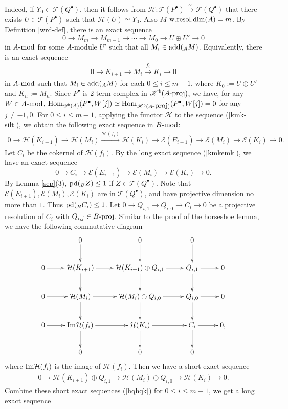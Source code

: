 \documentclass[12pt]{article}
\numberwithin{equation}{section}
\theoremstyle{definition}
\newcommand{\add}{{\rm add}}
\def\wrd{\mathop{\rm w.resol.dim}\nolimits}
\newcommand{\pd}{{\rm pd}}
\def\E{\mathcal{E}}
\newcommand{\F}{{\mathcal F}}
\def\H{\mathcal{H}}
\newcommand{\T}{{\mathcal T}}
\newcommand{\cpx}[1]{#1^{\bullet}}
\newcommand{\Db}[1]{{\mathscr D}^b(#1)}
\newcommand{\Kb}[1]{{\mathscr K}^b(#1)}
\newcommand{\modcat}{\ensuremath{\mbox{{\rm -mod}}}}
\newcommand{\pmodcat}[1]{#1\mbox{{\rm -proj}}}
\newcommand{\Hom}{{\rm Hom}}
\newcommand{\lra}{\longrightarrow}
\newcommand{\lraf}[1]{\stackrel{#1}{\lra}}
\newcommand{\ra}{\rightarrow}
\begin{document}
Indeed, if $Y_0\in \F(Q^{\bullet})$, then it follows from $\H: \T(P^{\bullet})\lraf{\simeq} \F(Q^{\bullet})$ that there exists $U\in \T(P^{\bullet})$ such that $\H(U)\simeq Y_0$.
Also $M$-$\wrd(A)=m$.
By Definition \ref{wrd-def}, there is an exact sequence
$$0\lra M_m\lra M_{m-1}\lra \cdots\lra M_0\lra U\oplus U'\lra 0$$
in $A\modcat$ for some $A$-module $U'$ such that all $M_i\in\add(_AM)$.
Equivalently, there is an exact sequence
\begin{align}\label{kmk-silt}
0\ra K_{i+1}\ra M_i\lraf{f_i} K_i\ra 0
\end{align} in $A\modcat$ such that $M_i\in\add(_AM)$ for each $0\le i\le m-1$, where $K_0:=U\oplus U'$ and $K_n:=M_n$.
Since $\cpx{P}$ is $2$-term complex in $\Kb{\pmodcat{A}}$, we have, for any $W\in A\modcat$, $\Hom_{\Db{A}}(P^{\bullet},W[j])\simeq \Hom_{\Kb{\pmodcat{A}}}(P^{\bullet},W[j])=0$ for any $j\neq -1,0$.
For $0\le i\le m-1$, applying the functor $\H$ to the sequence (\ref{kmk-silt}), we obtain the following exact sequence in $B\modcat$:
\begin{align}\label{kmkemk}
0\lra \H(K_{i+1})\lra\H(M_i)\lraf{\H(f_i)}\H(K_i)\lra\E(E_{i+1})\lra\E(M_i)\lra\E(K_i)\lra 0.
\end{align}
Let $C_i$ be the cokernel of $\H(f_i)$. By the long exact sequence (\ref{kmkemk}), we have an exact sequence $$0\lra C_i\lra \E(E_{i+1})\lra\E(M_i)\lra\E(K_i)\lra 0.$$
By Lemma \ref{sep}(3), $\pd(_BZ)\le 1$ if $Z\in \T(Q^{\bullet})$. Note that $\E(E_{i+1}),\E(M_i),\E(K_i)$ are in $\T(Q^{\bullet})$, and have projective dimension no more than $1$. Thus $\pd(_{B}C_i)\le 1$. Let $0\ra Q_{i,1}\ra Q_{i,0}\ra C_i\ra 0$ be a projective resolution of $C_i$ with $Q_{i,j}\in \pmodcat{B}$. Similar to the proof of the horseshoe lemma, we have the following commutative diagram
$$\xymatrix{
 &0\ar[d]&0\ar[d]&0\ar[d]&\\
0\ar[r] &\H(K_{i+1})\ar[r]\ar[d]&\H(K_{i+1})\oplus Q_{i,1}\ar[r]\ar[d]&Q_{i,1}\ar[r]\ar[d]&0\\
0\ar[r] &\H(M_i)\ar[r]\ar[d]&\H(M_i)\oplus Q_{i,0}\ar[r]\ar[d]&Q_{i,0}\ar[r]\ar[d]&0\\
0\ar[r] &{\rm Im}\H(f_i)\ar[r]\ar[d]&\H(K_i)\ar[r]\ar[d]&C_i\ar[r]\ar[d]&0,\\
 &0&0&0&
}$$
where ${\rm Im}\H(f_i)$ is the image of $\H(f_i)$. Then we have a short exact sequence
\begin{align}\label{hqhqk}
0\ra \H(K_{i+1})\oplus Q_{i,1}\ra \H(M_i)\oplus Q_{i,0}\ra \H(K_i)\ra 0.
\end{align}
Combine these short exact sequences (\ref{hqhqk}) for $0\le i\le m-1$, we get a long exact sequence
\end{document}
